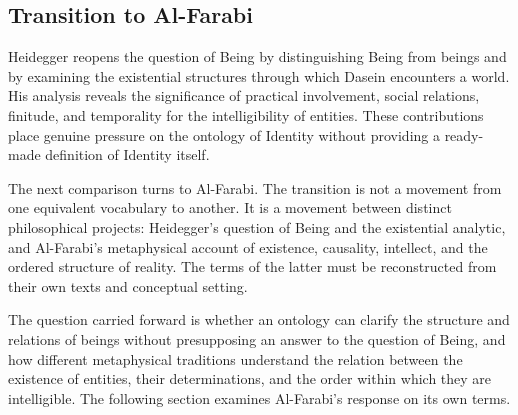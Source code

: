 \subsection{Transition to Al-Farabi}
\label{subsec:ch08-heidegger-transition}

\label{para:VS.B01.P01.C08.S11.SS15.P001}

Heidegger reopens the question of Being
by distinguishing Being from beings and
by examining the existential structures
through which Dasein encounters a world.
His analysis reveals the significance of
practical involvement, social relations,
finitude, and temporality for the
intelligibility of entities. These
contributions place genuine pressure
on the ontology of Identity without
providing a ready-made definition
of Identity itself.

\label{para:VS.B01.P01.C08.S11.SS15.P002}

The next comparison turns to Al-Farabi.
The transition is not a movement from
one equivalent vocabulary to another.
It is a movement between distinct
philosophical projects: Heidegger's
question of Being and the existential
analytic, and Al-Farabi's metaphysical
account of existence, causality,
intellect, and the ordered structure
of reality. The terms of the latter
must be reconstructed from their own
texts and conceptual setting.

\label{para:VS.B01.P01.C08.S11.SS15.P003}

The question carried forward is whether
an ontology can clarify the structure
and relations of beings without
presupposing an answer to the question
of Being, and how different metaphysical
traditions understand the relation
between the existence of entities,
their determinations, and the order
within which they are intelligible.
The following section examines
Al-Farabi's response on its own terms.

